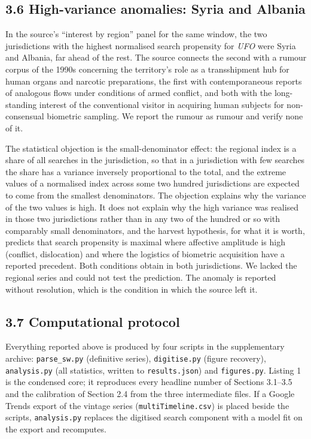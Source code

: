 \documentclass[
  10pt,
  a4paper,
]{article}
\begin{document}
\hypertarget{high-variance-anomalies-syria-and-albania}{%
\subsection{3.6 High-variance anomalies: Syria and
Albania}\label{high-variance-anomalies-syria-and-albania}}

In the source's ``interest by region'' panel for the same window, the
two jurisdictions with the highest normalised search propensity for
\emph{UFO} were Syria and Albania, far ahead of the rest. The source
connects the second with a rumour corpus of the 1990s concerning the
territory's role as a transshipment hub for human organs and narcotic
preparations, the first with contemporaneous reports of analogous flows
under conditions of armed conflict, and both with the long-standing
interest of the conventional visitor in acquiring human subjects for
non-consensual biometric sampling. We report the rumour as rumour and
verify none of it.

The statistical objection is the small-denominator effect: the regional
index is a share of all searches in the jurisdiction, so that in a
jurisdiction with few searches the share has a variance inversely
proportional to the total, and the extreme values of a normalised index
across some two hundred jurisdictions are expected to come from the
smallest denominators. The objection explains why the variance of the
two values is high. It does not explain why the high variance was
realised in those two jurisdictions rather than in any two of the
hundred or so with comparably small denominators, and the harvest
hypothesis, for what it is worth, predicts that search propensity is
maximal where affective amplitude is high (conflict, dislocation) and
where the logistics of biometric acquisition have a reported precedent.
Both conditions obtain in both jurisdictions. We lacked the regional
series and could not test the prediction. The anomaly is reported
without resolution, which is the condition in which the source left it.

\hypertarget{computational-protocol}{%
\subsection{3.7 Computational protocol}\label{computational-protocol}}

Everything reported above is produced by four scripts in the
supplementary archive: \texttt{parse\_sw.py} (definitive series),
\texttt{digitise.py} (figure recovery), \texttt{analysis.py} (all
statistics, written to \texttt{results.json}) and \texttt{figures.py}.
Listing 1 is the condensed core; it reproduces every headline number of
Sections 3.1--3.5 and the calibration of Section 2.4 from the three
intermediate files. If a Google Trends export of the vintage series
(\texttt{multiTimeline.csv}) is placed beside the scripts,
\texttt{analysis.py} replaces the digitised search component with a
model fit on the export and recomputes.
\end{document}
